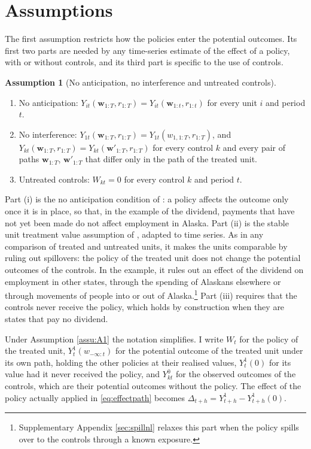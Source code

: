 \documentclass[12pt,a4paper]{article}
\theoremstyle{definition}
\newtheorem{assumption}{Assumption}
\theoremstyle{definition}\newtheorem{example}{Example}
\theoremstyle{definition}\newtheorem{definition}{Definition}
\begin{document}
\section{Assumptions\label{sec:assumptions}}

The first assumption restricts how the policies enter the potential outcomes. Its first two parts are needed by any time-series estimate of the effect of a policy, with or without controls, and its third part is specific to the use of controls.

\begin{assumption}[No anticipation, no interference and untreated controls\label{assu:A1}]
\begin{enumerate}
\item[(i)] No anticipation: $Y_{it}(\mathbf{w}_{1:T},r_{1:T})=Y_{it}(\mathbf{w}_{1:t},r_{1:t})$ for every unit $i$ and period $t$.
\item[(ii)] No interference: $Y_{1t}(\mathbf{w}_{1:T},r_{1:T})=Y_{1t}(w_{1,1:T},r_{1:T})$, and $Y_{kt}(\mathbf{w}_{1:T},r_{1:T})=Y_{kt}(\mathbf{w}'_{1:T},r_{1:T})$ for every control $k$ and every pair of paths $\mathbf{w}_{1:T}$, $\mathbf{w}'_{1:T}$ that differ only in the path of the treated unit.
\item[(iii)] Untreated controls: $W_{kt}=0$ for every control $k$ and period $t$.
\end{enumerate}
\end{assumption}

Part (i) is the no anticipation condition of \citet{RambachanSheppard2021}: a policy affects the outcome only once it is in place, so that, in the example of the dividend, payments that have not yet been made do not affect employment in Alaska. Part (ii) is the stable unit treatment value assumption of \citet{Rubin1980}, adapted to time series. As in any comparison of treated and untreated units, it makes the units comparable by ruling out spillovers: the policy of the treated unit does not change the potential outcomes of the controls. In the example, it rules out an effect of the dividend on employment in other states, through the spending of Alaskans elsewhere or through movements of people into or out of Alaska.\footnote{Supplementary Appendix \ref{sec:spillnl} relaxes this part when the policy spills over to the controls through a known exposure.} Part (iii) requires that the controls never receive the policy, which holds by construction when they are states that pay no dividend.

Under Assumption \ref{assu:A1} the notation simplifies. I write $W_t$ for the policy of the treated unit, $Y^1_t(w_{-\infty:t})$ for the potential outcome of the treated unit under its own path, holding the other policies at their realised values, $Y^1_t(0)$ for its value had it never received the policy, and $Y^0_{kt}$ for the observed outcomes of the controls, which are their potential outcomes without the policy. The effect of the policy actually applied in \eqref{eq:effectpath} becomes $\Delta_{t+h}=Y^1_{t+h}-Y^1_{t+h}(0)$.
\end{document}
